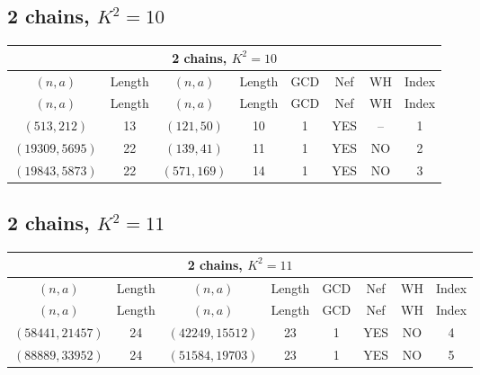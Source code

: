 \subsection{2 chains, \(K^2 = 10\)}
\begin{longtable}{|c|c|c|c|c|c|c|c|}
\hline
\multicolumn{8}{|c|}{2 chains, $K^2 = 10$}\\
\hline
$(n,a)$ & Length & $(n,a)$ & Length & GCD & Nef & WH & Index\\
\hline
\endfirsthead

\hline
$(n,a)$ & Length & $(n,a)$ & Length & GCD & Nef & WH & Index\\
\hline
\endhead
\hline
\endfoot

$(513, 212)$ & 13 & $(121, 50)$ & 10 & 1 & YES & -- & 1\\
$(19309, 5695)$ & 22 & $(139, 41)$ & 11 & 1 & YES & NO & 2\\
$(19843, 5873)$ & 22 & $(571, 169)$ & 14 & 1 & YES & NO & 3
\end{longtable}
\subsection{2 chains, \(K^2 = 11\)}
\begin{longtable}{|c|c|c|c|c|c|c|c|}
\hline
\multicolumn{8}{|c|}{2 chains, $K^2 = 11$}\\
\hline
$(n,a)$ & Length & $(n,a)$ & Length & GCD & Nef & WH & Index\\
\hline
\endfirsthead

\hline
$(n,a)$ & Length & $(n,a)$ & Length & GCD & Nef & WH & Index\\
\hline
\endhead
\hline
\endfoot

$(58441, 21457)$ & 24 & $(42249, 15512)$ & 23 & 1 & YES & NO & 4\\
$(88889, 33952)$ & 24 & $(51584, 19703)$ & 23 & 1 & YES & NO & 5
\end{longtable}
